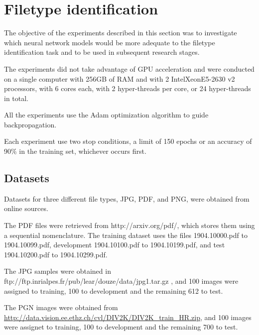 \section{Filetype identification}
The objective of the experiments described in this section was to investigate which neural network models would be more adequate to the filetype identification task and to be used in subsequent research stages.

The experiments did not take advantage of GPU acceleration and were  conducted on a single computer with 256GB of RAM and with 2 Intel\textregistered Xeon\textregistered E5-2630 v2 processors, with 6 cores each, with 2 hyper-threads per core, or 24 hyper-threads in total. 

All the experiments use the Adam
optimization algorithm to guide backpropagation.

Each experiment use two stop conditions, a limit of 150 epochs or an accuracy of 90\% in the training set, whichever occurs first.

\subsection{Datasets}

Datasets for three different file types, JPG, PDF, and PNG, were obtained from online sources.

The PDF files were retrieved from http://arxiv.org/pdf/, which stores them using a sequential nomenclature. The training dataset uses the files 1904.10000.pdf to 1904.10099.pdf, development 1904.10100.pdf to 1904.10199.pdf, and test 1904.10200.pdf to 1904.10299.pdf. 

The JPG samples were obtained in ftp://ftp.inrialpes.fr/pub/lear/douze/data/jpg1.tar.gz , and 100 images were assigned to training, 100 to development and the remaining 612 to test.

The PGN images were obtained from \url{http://data.vision.ee.ethz.ch/cvl/DIV2K/DIV2K_train_HR.zip}, and 100 images were assignet to training, 100 to development and the remaining 700 to test.


